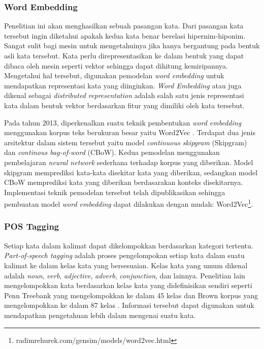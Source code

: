 \subsubsection{Word Embedding}
Penelitian ini akan menghasilkan sebuah pasangan kata. Dari pasangan kata tersebut ingin diketahui apakah kedua kata benar berelasi hipernim-hiponim. Sangat sulit bagi mesin untuk mengetahuinya jika hanya bergantung pada bentuk asli kata tersebut. Kata perlu direpresentasikan ke dalam bentuk yang dapat dibaca oleh mesin seperti vektor sehingga dapat dihitung kemiripannya. Mengetahui hal tersebut, digunakan pemodelan \textit{word embedding} untuk mendapatkan representasi kata yang diinginkan. \textit{Word Embedding} atau juga dikenal sebagai \textit{distributed representation} adalah salah satu jenis representasi kata dalam bentuk vektor berdasarkan fitur yang dimiliki oleh kata tersebut. 

Pada tahun 2013, diperkenalkan suatu teknik pembentukan \textit{word embedding} menggunakan korpus teks berukuran besar yaitu Word2Vec \cite{mikolov2013distributed}. Terdapat dua jenis arsitektur dalam sistem tersebut yaitu model \textit{continuous skipgram} (Skipgram) dan \textit{continous bag-of-word} (CBoW). Kedua pemodelan menggunakan pembelajaran \textit{neural network} sederhana terhadap korpus yang diberikan. Model skipgram memprediksi kata-kata disekitar kata yang diberikan, sedangkan model CBoW memprediksi kata yang diberikan berdasarakan konteks disekitarnya. Implementasi teknik pemodelan tersebut telah dipublikasikan sehingga pembuatan model \textit{word embedding} dapat dilakukan dengan mudah: Word2Vec\footnote{radimrehurek.com/gensim/models/word2vec.html}.


\subsubsection{POS Tagging}
Setiap kata dalam kalimat dapat dikelompokkan berdasarkan kategori tertentu. \textit{Part-of-speech tagging} adalah proses pengelompokan setiap kata dalam suatu kalimat ke dalam kelas kata yang bersesuaian. Kelas kata yang umum dikenal adalah \textit{noun}, \textit{verb}, \textit{adjective}, \textit{adverb}, \textit{conjunction}, dan lainnya. Penelitian lain mengelompokkan kata berdasarkan kelas kata yang didefinisikan sendiri seperti Penn Treebank yang mengelompokkan ke dalam 45 kelas \citep{marcus1993building} dan Brown korpus yang mengelompokkan ke dalam 87 kelas \citep{francis1979brown}. Informasi tersebut dapat digunakan untuk mendapatkan pengetahuan lebih dalam mengenai suatu kata. 

